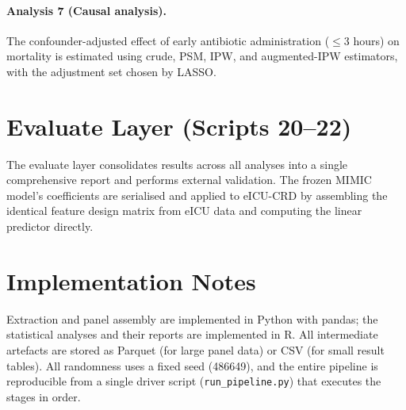 \paragraph{Analysis 7 (Causal analysis).} The confounder-adjusted effect of
early antibiotic administration ($\le 3$ hours) on mortality is estimated
using crude, PSM, IPW, and augmented-IPW estimators, with the adjustment set
chosen by LASSO.

\section{Evaluate Layer (Scripts 20--22)}

The evaluate layer consolidates results across all analyses into a single
comprehensive report and performs external validation. The frozen MIMIC
model's coefficients are serialised and applied to eICU-CRD by assembling
the identical feature design matrix from eICU data and computing the
linear predictor directly.

\section{Implementation Notes}
Extraction and panel assembly are implemented in Python with pandas; the
statistical analyses and their reports are implemented in R. All intermediate
artefacts are stored as Parquet (for large panel data) or CSV (for small
result tables). All randomness uses a fixed seed (486649), and the entire
pipeline is reproducible from a single driver script (\texttt{run\_pipeline.py})
that executes the stages in order.
